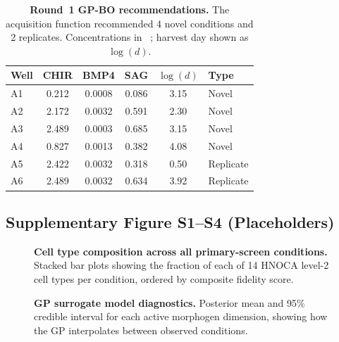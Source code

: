 \documentclass[times,twoside]{zHenriquesLab-StyleBioRxiv}
\begin{document}
\begin{table}[H]
\centering
\caption{\textbf{Round~1 GP-BO recommendations.} The acquisition function recommended 4 novel conditions and 2 replicates. Concentrations in \si{\micro\Molar}; harvest day shown as $\log(d)$.}\label{tab:recommendations-supp}
\small
\begin{tabular}{@{}lccccl@{}}
\toprule
\textbf{Well} & \textbf{CHIR} & \textbf{BMP4} & \textbf{SAG} & \textbf{$\log(d)$} & \textbf{Type} \\
\midrule
A1 & 0.212 & 0.0008 & 0.086 & 3.15 & Novel \\
A2 & 2.172 & 0.0032 & 0.591 & 2.30 & Novel \\
A3 & 2.489 & 0.0003 & 0.685 & 3.15 & Novel \\
A4 & 0.827 & 0.0013 & 0.382 & 4.08 & Novel \\
A5 & 2.422 & 0.0032 & 0.318 & 0.50 & Replicate \\
A6 & 2.489 & 0.0032 & 0.634 & 3.92 & Replicate \\
\bottomrule
\end{tabular}
\end{table}

\subsection*{Supplementary Figure S1--S4 (Placeholders)}

\begin{figure}[H]
\centering
{}
\caption{\textbf{Cell type composition across all primary-screen conditions.} Stacked bar plots showing the fraction of each of 14 HNOCA level-2 cell types per condition, ordered by composite fidelity score.}
\label{fig:supp-composition}
\end{figure}

\begin{figure}[H]
\centering
{}
\caption{\textbf{GP surrogate model diagnostics.} Posterior mean and 95\% credible interval for each active morphogen dimension, showing how the GP interpolates between observed conditions.}
\label{fig:supp-gp}
\end{figure}
\end{document}
